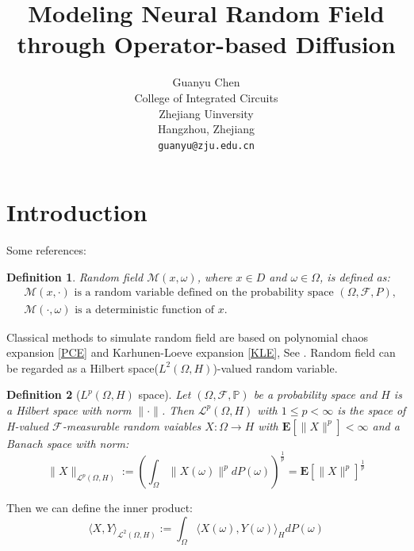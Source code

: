 \documentclass{article}
\title{Modeling Neural Random Field through Operator-based Diffusion}
\author{%
    Guanyu Chen \\
    College of Integrated Circuits\\
    Zhejiang Uinversity\\
    Hangzhou, Zhejiang\\
    \texttt{guanyu@zju.edu.cn} 
}
\newtheorem{definition}{Definition}
\begin{document}
\maketitle


\begin{abstract}

\end{abstract}


\section{Introduction}
Some references: \cite{whittle1954stationary, carrizo2022general, lindgren2020diffusion, sigrist2015stochastic, bolin2020rational, Porcu2023}
\begin{definition}
    Random field $\mathcal{M}(x, \omega)$, where $x\in D$ and $\omega \in \Omega$, is defined as:
\begin{equation}
    \begin{aligned}
        & \mathcal{M}(x, \cdot) \text{ is a random variable defined on the probability space } (\Omega, \mathcal{F}, P),\\
        & \mathcal{M}(\cdot, \omega) \text{ is a deterministic function of } x.
    \end{aligned}
\end{equation}
\end{definition}
Classical methods to simulate random field are based on polynomial chaos expansion \ref{PCE} and Karhunen-Loeve expansion \ref{KLE}, See \cite{Lord_Powell_Shardlow_2014}.
Random field can be regarded as a Hilbert space($L^2(\Omega, H)$)-valued random variable.
\begin{definition}[$L^p(\Omega, H)$ space]
  Let $(\Omega, \mathcal{F}, \mathbb{P})$ be a probability space and $H$ is a Hilbert space with norm $\|\cdot\|$. Then $\mathcal{L}^p(\Omega, H)$ with $1\leq p<\infty$ is the space
  of H-valued $\mathcal{F}$-measurable random vaiables $X:\Omega\rightarrow H$ with $\mathbf{E}[\|X\|^p]<\infty$ and a Banach space with norm:
  \begin{equation}
      \|X\|_{\mathcal{L}^p(\Omega, H)}:=\left(\int_\Omega \|X(\omega)\|^pdP(\omega)\right)^{\frac{1}{p}}=\mathbf{E}[\|X\|^p]^{\frac{1}{p}}
  \end{equation}
\end{definition}
Then we can define the inner product: 
\begin{equation}
  \langle X, Y\rangle_{\mathcal{L}^2(\Omega, H)}:=\int_\Omega \langle X(\omega), Y(\omega)\rangle_H dP(\omega)
\end{equation}
\end{document}

